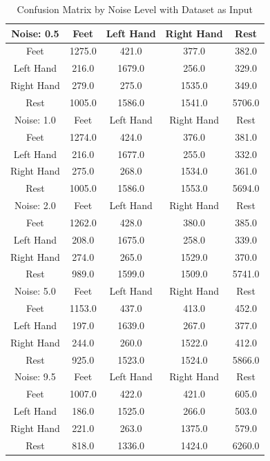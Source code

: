 \begin{table}[!htbp]
    \centering
    \begin{tabular}{|c||c|c|c|c|}
        \hline
		Noise: 0.5 & Feet & Left Hand & Right Hand & Rest \\
        \hline
        \hline
        Feet & 1275.0 & 421.0 & 377.0 & 382.0 \\
        \hline
        Left Hand & 216.0 & 1679.0 & 256.0 & 329.0 \\
        \hline
        Right Hand & 279.0 & 275.0 & 1535.0 & 349.0 \\
        \hline
        Rest & 1005.0 & 1586.0 & 1541.0 & 5706.0 \\
        \hline
        \hline
        \hline
		Noise: 1.0 & Feet & Left Hand & Right Hand & Rest \\
        \hline
        \hline
        Feet & 1274.0 & 424.0 & 376.0 & 381.0 \\
        \hline
        Left Hand & 216.0 & 1677.0 & 255.0 & 332.0 \\
        \hline
        Right Hand & 275.0 & 268.0 & 1534.0 & 361.0 \\
        \hline
        Rest & 1005.0 & 1586.0 & 1553.0 & 5694.0 \\
        \hline
        \hline
        \hline
		Noise: 2.0 & Feet & Left Hand & Right Hand & Rest \\
        \hline
        \hline
        Feet & 1262.0 & 428.0 & 380.0 & 385.0 \\
        \hline
        Left Hand & 208.0 & 1675.0 & 258.0 & 339.0 \\
        \hline
        Right Hand & 274.0 & 265.0 & 1529.0 & 370.0 \\
        \hline
        Rest & 989.0 & 1599.0 & 1509.0 & 5741.0 \\
        \hline
        \hline
        \hline
		Noise: 5.0 & Feet & Left Hand & Right Hand & Rest \\
        \hline
        \hline
        Feet & 1153.0 & 437.0 & 413.0 & 452.0 \\
        \hline
        Left Hand & 197.0 & 1639.0 & 267.0 & 377.0 \\
        \hline
        Right Hand & 244.0 & 260.0 & 1522.0 & 412.0 \\
        \hline
        Rest & 925.0 & 1523.0 & 1524.0 & 5866.0 \\
        \hline
        \hline
        \hline
		Noise: 9.5 & Feet & Left Hand & Right Hand & Rest \\
        \hline
        \hline
        Feet & 1007.0 & 422.0 & 421.0 & 605.0 \\
        \hline
        Left Hand & 186.0 & 1525.0 & 266.0 & 503.0 \\
        \hline
        Right Hand & 221.0 & 263.0 & 1375.0 & 579.0 \\
        \hline
        Rest & 818.0 & 1336.0 & 1424.0 & 6260.0 \\
        \hline
    \end{tabular}
    \caption{Confusion Matrix by Noise Level with Dataset as Input}\label{tab:confusion_matrix_dataset_noise}
\end{table}



